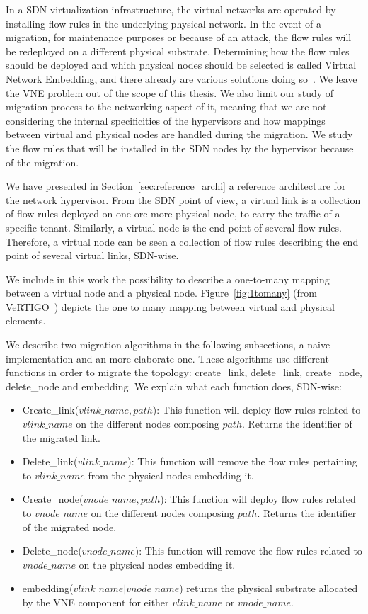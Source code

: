 \label{sec:migration}
In a SDN virtualization infrastructure, the virtual networks are operated by installing flow rules in the underlying physical network.
In the event of a migration, for maintenance purposes or because of an attack, the flow rules will be redeployed on a different physical substrate.
Determining how the flow rules should be deployed and which physical nodes should be selected is called Virtual Network Embedding, and there already are various solutions doing so~\cite{Zangiabady2017e, Papagianni2013, Chowdhury2016d, Wang2015}.
We leave the VNE problem out of the scope of this thesis.
We also limit our study of migration process to the networking aspect of it, meaning that we are not considering the internal specificities of the hypervisors and how mappings between virtual and physical nodes are handled during the migration.
We study the flow rules that will be installed in the SDN nodes by the hypervisor because of the migration.



We have presented in Section~\ref{sec:reference_archi} a reference architecture for the network hypervisor.
From the SDN point of view, a virtual link is a collection of flow rules deployed on one ore more physical node, to carry the traffic of a specific tenant.
Similarly, a virtual node is the end point of several flow rules.
Therefore, a virtual node can be seen a collection of flow rules describing the end point of several virtual links, SDN-wise.

We include in this work the possibility to describe a one-to-many mapping between a virtual node and a physical node.
Figure~\ref{fig:1tomany} (from VeRTIGO~\cite{VeRTIGO-Corin2012a}) depicts the one to many mapping between virtual and physical elements.

We describe two migration algorithms in the following subsections, a naive implementation and an more elaborate one.
These algorithms use different functions in order to migrate the topology: create\_link, delete\_link, create\_node, delete\_node and embedding. 
We explain what each function does, SDN-wise:

\begin{itemize}
\item Create\_link($vlink\_name,path$): This function will deploy flow rules related to $vlink\_name$ on the different nodes composing $path$. Returns the identifier of the migrated link.
\item Delete\_link($vlink\_name$): This function will remove the flow rules pertaining to $vlink\_name$ from the physical nodes embedding it.
\item Create\_node($vnode\_name,path$): This function will deploy flow rules related to $vnode\_name$ on the different nodes composing $path$. Returns the identifier of the migrated node.
\item Delete\_node($vnode\_name$): This function will remove the flow rules related to  $vnode\_name$ on the physical nodes embedding it.
\item embedding($vlink\_name|vnode\_name$) returns the physical substrate allocated by the VNE component for either $vlink\_name$ or $vnode\_name$.
\end{itemize}

